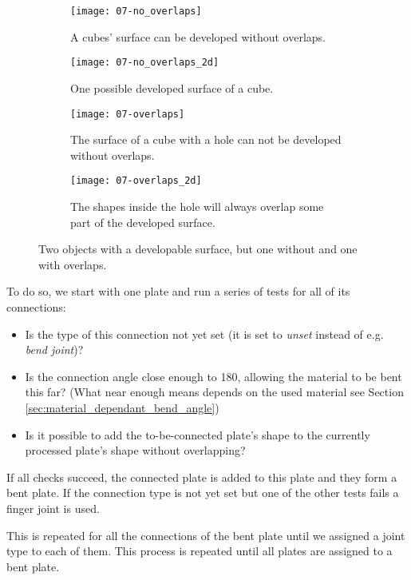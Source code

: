 \documentclass[../ClassicThesis.tex]{subfiles}
\begin{document}
\begin{figure}[h]
  \centering
  \begin{subfigure}[b]{0.49\textwidth}
    \centering
    \texttt{[image: 07-no\_overlaps]}
    \caption{A cubes' surface can be developed without overlaps.}
    \label{fig:overlaps:no-3d}
  \end{subfigure}
  \begin{subfigure}[b]{0.49\textwidth}
    \centering
    \texttt{[image: 07-no\_overlaps\_2d]}
    \caption{One possible developed surface of a cube.}
    \label{fig:overlapsh:no-2d}
  \end{subfigure}
  \begin{subfigure}[b]{0.49\textwidth}
    \centering
    \texttt{[image: 07-overlaps]}
    \caption{The surface of a cube with a hole can not be developed without overlaps.}
    \label{fig:overlaps:some-3d}
  \end{subfigure}
  \begin{subfigure}[b]{0.49\textwidth}
    \centering
    \texttt{[image: 07-overlaps\_2d]}
    \caption{The shapes inside the hole will always overlap some part of the developed surface.}
    \label{fig:overlaps:some-2d}
  \end{subfigure}
  \caption{Two objects with a developable surface, but one without and one with overlaps.}
  \label{fig:overlaps}
\end{figure}

To do so, we start with one plate and run a series of tests for all of its connections:
\begin{itemize}
\item Is the type of this connection not yet set (it is set to \emph{unset} instead of e.g. \emph{bend joint})?
\item Is the connection angle close enough to 180\textdegree{}, allowing the material to be bent this far? (What near enough means depends on the used material see Section \ref{sec:material_dependant_bend_angle})
\item Is it possible to add the to-be-connected plate's shape to the currently processed plate's shape without overlapping?
\end{itemize}
If all checks succeed, the connected plate is added to this plate and they form a bent plate. If the connection type is not yet set but one of the other tests fails a finger joint is used.

This is repeated for all the connections of the bent plate until we assigned a joint type to each of them. This process is repeated until all plates are assigned to a bent plate.
\end{document}

